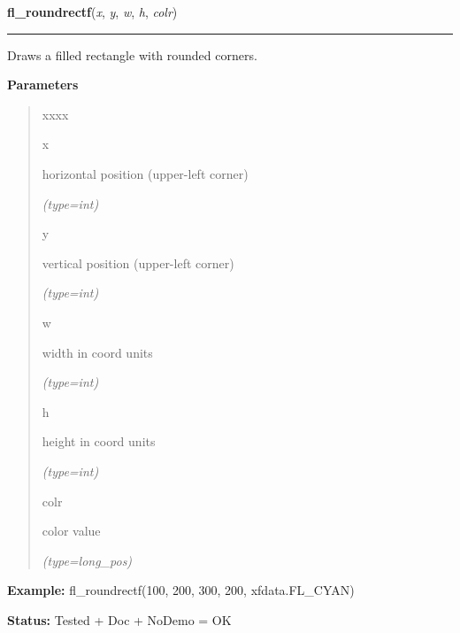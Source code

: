 \hspace{.8\funcindent}\begin{boxedminipage}{\funcwidth}

    \raggedright \textbf{fl\_roundrectf}(\textit{x}, \textit{y}, \textit{w}, \textit{h}, \textit{colr})

    \vspace{-1.5ex}

    \rule{\textwidth}{0.5\fboxrule}
\setlength{\parskip}{2ex}
    Draws a filled rectangle with rounded corners.

\setlength{\parskip}{1ex}
      \textbf{Parameters}
      \vspace{-1ex}

      \begin{quote}
        \begin{Ventry}{xxxx}

          \item[x]

          horizontal position (upper-left corner)

            {\it (type=int)}

          \item[y]

          vertical position (upper-left corner)

            {\it (type=int)}

          \item[w]

          width in coord units

            {\it (type=int)}

          \item[h]

          height in coord units

            {\it (type=int)}

          \item[colr]

          color value

            {\it (type=long\_pos)}

        \end{Ventry}

      \end{quote}

\textbf{Example:} fl\_roundrectf(100, 200, 300, 200, xfdata.FL\_CYAN)



\textbf{Status:} Tested + Doc + NoDemo = OK



    \end{boxedminipage}

